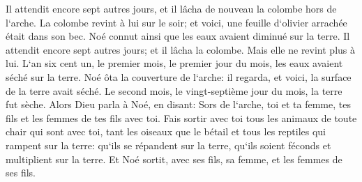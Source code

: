 \verse Il attendit encore sept autres jours, et il lâcha de nouveau la colombe hors de l`arche. 
\verse La colombe revint à lui sur le soir; et voici, une feuille d`olivier arrachée était dans son bec. Noé connut ainsi que les eaux avaient diminué sur la terre. 
\verse Il attendit encore sept autres jours; et il lâcha la colombe. Mais elle ne revint plus à lui. 
\verse L`an six cent un, le premier mois, le premier jour du mois, les eaux avaient séché sur la terre. Noé ôta la couverture de l`arche: il regarda, et voici, la surface de la terre avait séché. 
\verse Le second mois, le vingt-septième jour du mois, la terre fut sèche. 
\verse Alors Dieu parla à Noé, en disant: 
\verse Sors de l`arche, toi et ta femme, tes fils et les femmes de tes fils avec toi. 
\verse Fais sortir avec toi tous les animaux de toute chair qui sont avec toi, tant les oiseaux que le bétail et tous les reptiles qui rampent sur la terre: qu`ils se répandent sur la terre, qu`ils soient féconds et multiplient sur la terre. 
\verse Et Noé sortit, avec ses fils, sa femme, et les femmes de ses fils. 
